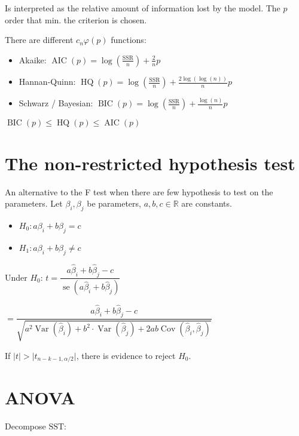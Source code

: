 \documentclass[10pt, a4paper, landscape]{article}
\DeclareMathOperator{\Var}{Var}
\DeclareMathOperator{\se}{se}
\DeclareMathOperator{\Cov}{Cov}
\DeclareMathOperator{\AIC}{AIC}
\DeclareMathOperator{\HQ}{HQ}
\DeclareMathOperator{\BIC}{BIC}
\newcommand{\SSR}{\text{SSR}}
\newcommand{\SST}{\text{SST}}
\begin{document}
\begin{multicols}{3}
Is interpreted as the relative amount of information lost by the model. The \( p \) order that min. the criterion is chosen.

There are different \( c_{n} \varphi(p) \) functions:

\begin{itemize}[leftmargin=*]
	\item Akaike: \( \AIC(p) = \log(\frac{\SSR}{n}) + \frac{2}{n} p \)
	\item Hannan-Quinn: \( \HQ(p) = \log(\frac{\SSR}{n}) + \frac{2 \log(\log(n))}{n} p \)
	\item Schwarz / Bayesian: \( \BIC(p) = \log(\frac{\SSR}{n}) + \frac{\log(n)}{n} p \)
\end{itemize}

\( \BIC(p) \leq \HQ(p) \leq \AIC(p) \)

\section*{The non-restricted hypothesis test}

An alternative to the F test when there are few hypothesis to test on the parameters. Let \( \beta_{i}, \beta_{j} \) be parameters, \( a, b, c \in \mathbb{R} \) are constants.

\begin{itemize}[leftmargin=*]
	\item \( H_{0}: a \beta_{i} + b \beta_{j} = c \)
	\item \( H_{1}: a \beta_{i} + b \beta_{j} \neq c \)
\end{itemize}

\begin{center}
	Under \( H_{0} \): \quad
	\( t = \dfrac{a \hat{\beta}_{i} + b \hat{\beta}_{j} - c}{\se(a \hat{\beta}_{i} + b \hat{\beta}_{j})} \)

	\( = \dfrac{a \hat{\beta}_{i} + b \hat{\beta}_{j} - c}{\sqrt{a^{2} \Var(\hat{\beta}_{i}) + b^{2} \cdot \Var(\hat{\beta}_{j}) + 2 a b \Cov(\hat{\beta}_{i}, \hat{\beta}_{j})}} \)
\end{center}

If \( \lvert t \rvert > \lvert t_{n - k - 1, \alpha / 2} \rvert \), there is evidence to reject \( H_{0} \).

\section*{ANOVA}

Decompose \( \SST \):


\end{multicols}
\end{document}
